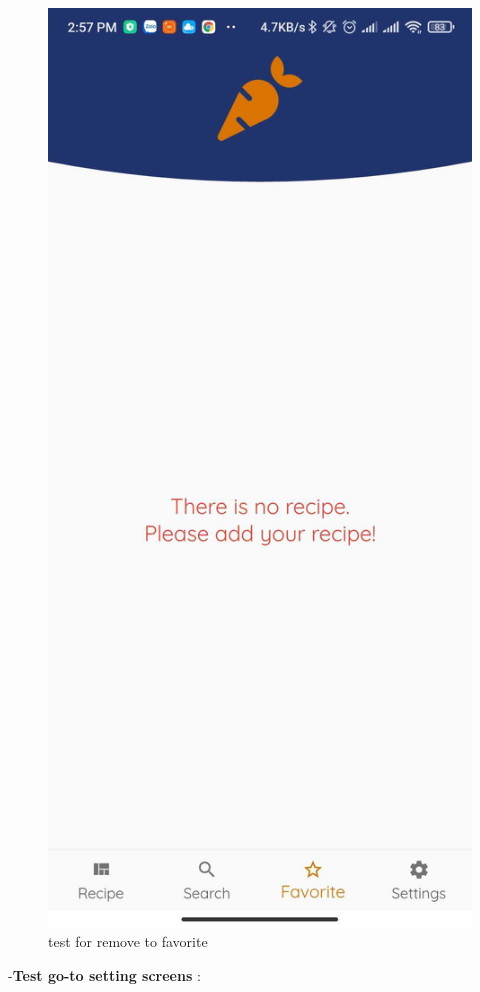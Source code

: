 \documentclass{article}
\begin{document}
\begin{figure}[h!]
    \includegraphics[scale=0.1]{Images/Favorite-emptylist.jpg}
    \caption{test for remove to favorite}
    \label{fig:cookingbook}
    \end{figure}
\newpage 
    -\textbf{Test go-to setting screens }: \\
\end{document}
